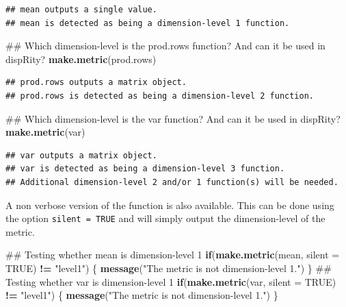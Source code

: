 \documentclass[]{book}
\newenvironment{Shaded}{\begin{snugshade}}{\end{snugshade}}
\newcommand{\KeywordTok}[1]{\textcolor[rgb]{0.13,0.29,0.53}{\textbf{#1}}}
\newcommand{\DataTypeTok}[1]{\textcolor[rgb]{0.13,0.29,0.53}{#1}}
\newcommand{\StringTok}[1]{\textcolor[rgb]{0.31,0.60,0.02}{#1}}
\newcommand{\OtherTok}[1]{\textcolor[rgb]{0.56,0.35,0.01}{#1}}
\newcommand{\ControlFlowTok}[1]{\textcolor[rgb]{0.13,0.29,0.53}{\textbf{#1}}}
\newcommand{\OperatorTok}[1]{\textcolor[rgb]{0.81,0.36,0.00}{\textbf{#1}}}
\newcommand{\NormalTok}[1]{#1}
\theoremstyle{definition}
\theoremstyle{definition}
\theoremstyle{remark}
\begin{document}
\begin{verbatim}
## mean outputs a single value.
## mean is detected as being a dimension-level 1 function.
\end{verbatim}

\begin{Shaded}
\begin{Highlighting}[]
\NormalTok{## Which dimension-level is the prod.rows function? And can it be used in dispRity?}
\KeywordTok{make.metric}\NormalTok{(prod.rows)}
\end{Highlighting}
\end{Shaded}

\begin{verbatim}
## prod.rows outputs a matrix object.
## prod.rows is detected as being a dimension-level 2 function.
\end{verbatim}

\begin{Shaded}
\begin{Highlighting}[]
\NormalTok{## Which dimension-level is the var function? And can it be used in dispRity?}
\KeywordTok{make.metric}\NormalTok{(var)}
\end{Highlighting}
\end{Shaded}

\begin{verbatim}
## var outputs a matrix object.
## var is detected as being a dimension-level 3 function.
## Additional dimension-level 2 and/or 1 function(s) will be needed.
\end{verbatim}

A non verbose version of the function is also available. This can be
done using the option \texttt{silent\ =\ TRUE} and will simply output
the dimension-level of the metric.

\begin{Shaded}
\begin{Highlighting}[]
\NormalTok{## Testing whether mean is dimension-level 1}
\ControlFlowTok{if}\NormalTok{(}\KeywordTok{make.metric}\NormalTok{(mean, }\DataTypeTok{silent =} \OtherTok{TRUE}\NormalTok{) }\OperatorTok{!=}\StringTok{ "level1"}\NormalTok{) \{}
    \KeywordTok{message}\NormalTok{(}\StringTok{"The metric is not dimension-level 1."}\NormalTok{)}
\NormalTok{\}}
\NormalTok{## Testing whether var is dimension-level 1}
\ControlFlowTok{if}\NormalTok{(}\KeywordTok{make.metric}\NormalTok{(var, }\DataTypeTok{silent =} \OtherTok{TRUE}\NormalTok{) }\OperatorTok{!=}\StringTok{ "level1"}\NormalTok{) \{}
    \KeywordTok{message}\NormalTok{(}\StringTok{"The metric is not dimension-level 1."}\NormalTok{)}
\NormalTok{\}}
\end{Highlighting}
\end{Shaded}
\end{document}
